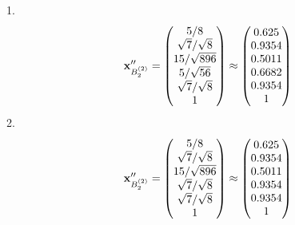 \documentclass[10pt,a4paper]{article}
\begin{document}
	1.
	\[
		\bold{x}''_{B_2^{(2)}} = 
		\begin{pmatrix}
			{{5}} / {{8}} \\
			{\sqrt{7}} / {\sqrt{8}} \\
			{{15}} / {\sqrt{896}} \\
			{{5}} / {\sqrt{56}} \\
			{\sqrt{7}} / {\sqrt{8}} \\
			{1}{} \\
		\end{pmatrix}
		\approx
		\begin{pmatrix}
			0.625    \\
			0.9354   \\
			0.5011   \\
			0.6682   \\
			0.9354   \\
			1        \\
		\end{pmatrix}
	\]
	2.
	\[
		\bold{x}''_{B_2^{(2)}} = 
		\begin{pmatrix}
			{{5}} / {{8}} \\
			{\sqrt{7}} / {\sqrt{8}} \\
			{{15}} / {\sqrt{896}} \\
			{\sqrt{7}} / {\sqrt{8}} \\
			{\sqrt{7}} / {\sqrt{8}} \\
			{1}{} \\
		\end{pmatrix}
		\approx
		\begin{pmatrix}
			0.625    \\
			0.9354   \\
			0.5011   \\
			0.9354   \\
			0.9354   \\
			1        \\
		\end{pmatrix}
	\]

\end{document}
